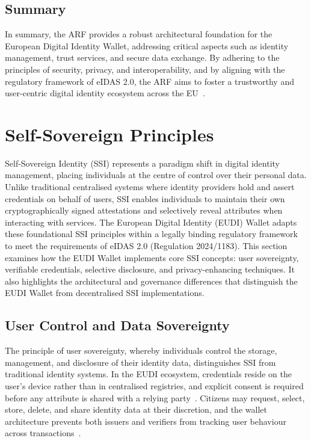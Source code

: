 \documentclass[sigconf,balance,nonacm,authordraft]{acmart}
\begin{document}
\subsection{Summary}
In summary, the ARF provides a robust architectural foundation for the European Digital Identity Wallet, addressing critical aspects such as identity management, trust services, and secure data exchange. By adhering to the principles of security, privacy, and interoperability, and by aligning with the regulatory framework of eIDAS 2.0, the ARF aims to foster a trustworthy and user-centric digital identity ecosystem across the EU~\cite{EU_ARF2024,EU_eIDAS2024}.

\section{Self-Sovereign Principles}
\label{sec:ssi}

Self-Sovereign Identity (SSI) represents a paradigm shift in digital identity management, placing individuals at the centre of control over their personal data. Unlike traditional centralised systems where identity providers hold and assert credentials on behalf of users, SSI enables individuals to maintain their own cryptographically signed attestations and selectively reveal attributes when interacting with services. The European Digital Identity (EUDI) Wallet adapts these foundational SSI principles within a legally binding regulatory framework to meet the requirements of eIDAS 2.0 (Regulation 2024/1183). This section examines how the EUDI Wallet implements core SSI concepts: user sovereignty, verifiable credentials, selective disclosure, and privacy-enhancing techniques. It also highlights the architectural and governance differences that distinguish the EUDI Wallet from decentralised SSI implementations.

\subsection{User Control and Data Sovereignty}

The principle of user sovereignty, whereby individuals control the storage, management, and disclosure of their identity data, distinguishes SSI from traditional identity systems. In the EUDI ecosystem, credentials reside on the user's device rather than in centralised registries, and explicit consent is required before any attribute is shared with a relying party~\cite{ZKPDiscussion_Recital15,ZKPDiscussion_Article5a}. Citizens may request, select, store, delete, and share identity data at their discretion, and the wallet architecture prevents both issuers and verifiers from tracking user behaviour across transactions~\cite{ZKPDiscussion_Article5a}. 
\end{document}
